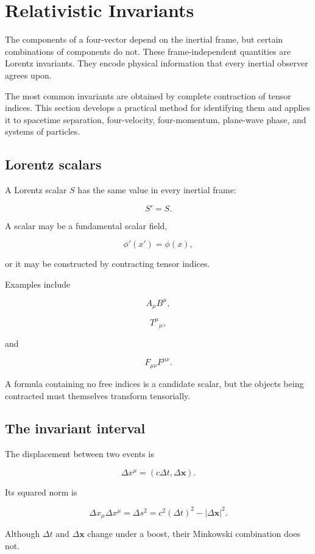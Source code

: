 \section{Relativistic Invariants}
\label{sec:relativistic_invariants}

The components of a four-vector depend on the inertial frame, but certain combinations of components do not. These frame-independent quantities are Lorentz invariants. They encode physical information that every inertial observer agrees upon.

The most common invariants are obtained by complete contraction of tensor indices. This section develops a practical method for identifying them and applies it to spacetime separation, four-velocity, four-momentum, plane-wave phase, and systems of particles.

\subsection{Lorentz scalars}

A Lorentz scalar \(S\) has the same value in every inertial frame:

\[
\boxed{
S'=S
}.
\]

A scalar may be a fundamental scalar field,

\[
\phi'(x')=\phi(x),
\]

or it may be constructed by contracting tensor indices.

Examples include

\[
A_{\mu}B^{\mu},
\]

\[
T^{\mu}{}_{\mu},
\]

and

\[
F_{\mu\nu}F^{\mu\nu}.
\]

A formula containing no free indices is a candidate scalar, but the objects being contracted must themselves transform tensorially.

\subsection{The invariant interval}

The displacement between two events is

\[
\Delta x^{\mu}
=
(c\Delta t,\Delta\mathbf{x}).
\]

Its squared norm is

\[
\boxed{
\Delta x_{\mu}\Delta x^{\mu}
=
\Delta s^{2}
=
c^{2}(\Delta t)^{2}
-
|\Delta\mathbf{x}|^{2}
}.
\]

Although \(\Delta t\) and \(\Delta\mathbf{x}\) change under a boost, their Minkowski combination does not.

